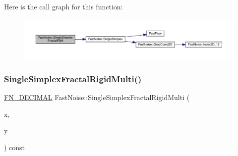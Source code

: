Here is the call graph for this function\+:
\nopagebreak
\begin{figure}[H]
\begin{center}
\leavevmode
\includegraphics[width=350pt]{d1/dd8/class_fast_noise_a2ac44ef2c9843f3024a3f0be9a47526b_cgraph}
\end{center}
\end{figure}
\mbox{\label{class_fast_noise_a185d239a0bbbc93f673eeb1fe49eae80}} 
\subsubsection{\texorpdfstring{Single\+Simplex\+Fractal\+Rigid\+Multi()}{SingleSimplexFractalRigidMulti()}\hspace{0.1cm}{\footnotesize\ttfamily [1/2]}}
{\footnotesize\ttfamily \mbox{\hyperlink{_fast_noise_8h_a75a9ef6d2541c4921815b885bfd449c3}{F\+N\+\_\+\+D\+E\+C\+I\+M\+AL}} Fast\+Noise\+::\+Single\+Simplex\+Fractal\+Rigid\+Multi (\begin{DoxyParamCaption}\item[{\mbox{\hyperlink{_fast_noise_8h_a75a9ef6d2541c4921815b885bfd449c3}{F\+N\+\_\+\+D\+E\+C\+I\+M\+AL}}}]{x,  }\item[{\mbox{\hyperlink{_fast_noise_8h_a75a9ef6d2541c4921815b885bfd449c3}{F\+N\+\_\+\+D\+E\+C\+I\+M\+AL}}}]{y }\end{DoxyParamCaption}) const\hspace{0.3cm}{\ttfamily [private]}}

